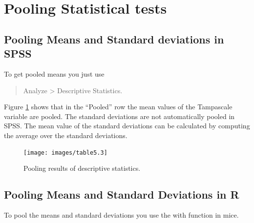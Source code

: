 \documentclass[
]{book}
\begin{document}
\hypertarget{pooling-statistical-tests}{%
\section{Pooling Statistical tests}\label{pooling-statistical-tests}}

\hypertarget{pooling-means-and-standard-deviations-in-spss}{%
\subsection{Pooling Means and Standard deviations in SPSS}\label{pooling-means-and-standard-deviations-in-spss}}

To get pooled means you just use

\begin{quote}
Analyze \textgreater{} Descriptive Statistics.
\end{quote}

Figure \ref{fig:tab5-3} shows that in the ``Pooled'' row the mean values of the Tampascale variable are pooled. The standard deviations are not automatically pooled in SPSS. The mean value of the standard deviations can be calculated by computing the average over the standard deviations.

\begin{figure}

{\centering \texttt{[image: images/table5.3]} 

}

\caption{Pooling results of descriptive statistics.}\label{fig:tab5-3}
\end{figure}

\hypertarget{pooling-means-and-standard-deviations-in-r}{%
\subsection{Pooling Means and Standard Deviations in R}\label{pooling-means-and-standard-deviations-in-r}}

To pool the means and standard deviations you use the with function in mice.
\end{document}
